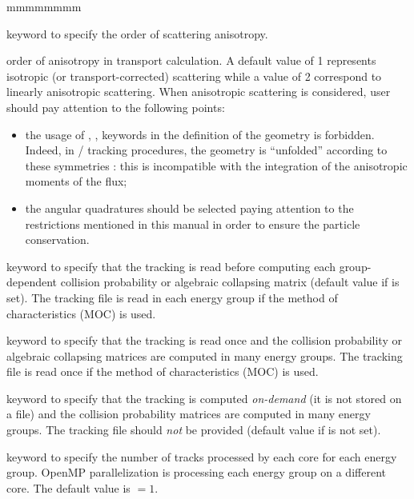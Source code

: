 \begin{ListeDeDescription}{mmmmmmmm}

\item[\moc{ANIS}] keyword to specify the order of scattering anisotropy. 

\item[\dusa{nanis}] order of anisotropy in transport calculation.
A default value of 1 represents isotropic (or transport-corrected) scattering while a value of 2
correspond to linearly anisotropic scattering. When anisotropic scattering is considered, user should pay attention to the following points:
\begin{itemize}
\item the usage of , ,  keywords in the definition of the geometry is forbidden. Indeed, in / tracking procedures, the geometry is ``unfolded'' according to these symmetries : this is incompatible with the integration of the anisotropic moments of the flux; \\
\item the angular quadratures should be selected paying attention to the restrictions mentioned in this manual in order to ensure the particle conservation.
\end{itemize}

\item[\moc{ONEG}] keyword to specify that the tracking is read before computing each group-dependent collision
probability or algebraic collapsing matrix (default value if  is set). The tracking file is
read in each energy group if the method of characteristics (MOC) is used.

\item[\moc{ALLG}] keyword to specify that the tracking is read once and the collision
probability or algebraic collapsing matrices are computed in many energy groups.  The tracking file is
read once if the method of characteristics (MOC) is used.
 
\item[\moc{XCLL}] keyword to specify that the tracking is computed {\sl on-demand} (it is not stored on a file) and the
collision probability matrices are computed in many energy groups. The tracking
file  should {\sl not} be provided (default value if  is not set).

\item[\moc{BATCH}] keyword to specify the number of tracks processed by each core for each energy group. OpenMP parallelization is processing each energy group on a different core. The default value is  $=1$.


\end{ListeDeDescription}
